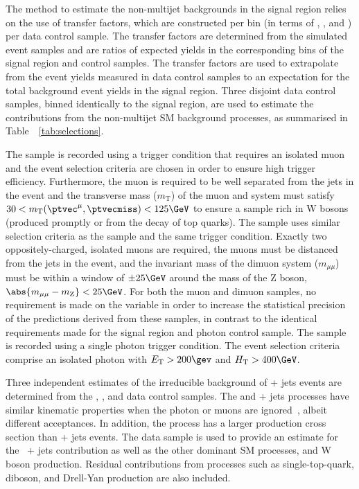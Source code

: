 The method to estimate the non-multijet backgrounds in the signal
region relies on the use of transfer factors, which are constructed
per bin (in terms of \njet, \nb, and \scalht) per data control
sample. The transfer factors are determined from the simulated event
samples and are ratios of expected yields in the corresponding bins of
the signal region and control samples. The transfer factors are used
to extrapolate from the event yields measured in data control samples
to an expectation for the total background event yields in the signal
region.  Three disjoint data control samples, binned identically to
the signal region, are used to estimate the contributions from the
non-multijet SM background processes, as summarised in
Table~~\ref{tab:selections}.

The \mj sample is recorded using a trigger condition that requires an
isolated muon and the event selection criteria are chosen in order to
ensure high trigger efficiency. Furthermore, the muon is required to
be well separated from the jets in the event and the transverse mass
($m_{\text{T}}$) of the muon and \ptvecmiss system must satisfy $30 <
m_\text{T}(\ptvec^\mu,\ptvecmiss) < 125\GeV$ to ensure a sample rich
in W bosons (produced promptly or from the decay of top quarks). The
\mmj sample uses similar selection criteria as the \mj sample and the
same trigger condition. Exactly two oppositely-charged, isolated muons
are required, the muons must be distanced from the jets in the event,
and the invariant mass of the dimuon system ($m_{\mu\mu}$) must be
within a window of $\pm 25\GeV$ around the mass of the Z boson, $
\abs{m_{\mu\mu} - m_\text{Z}} < 25\GeV$. For both the muon and dimuon
samples, no requirement is made on the variable \alphat in order to
increase the statistical precision of the predictions derived from
these samples, in contrast to the identical \alphat requirements made
for the signal region and photon control sample. The \gj sample is
recorded using a single photon trigger condition. The event selection
criteria comprise an isolated photon with $\Et > 200\gev$ and $\scalht
> 400\GeV$.

Three independent estimates of the irreducible background of \znunu +
jets events are determined from the \gj, \mmj, and \mj data control
samples. The \gj and \zmumu + jets processes have similar kinematic
properties when the photon or muons are ignored~\cite{Bern:2011pa}, 
albeit different acceptances. In addition, the \gj process has a
larger production cross section than \znunu + jets events. The \mj
data sample is used to provide an estimate for the \znunu\ + jets
contribution as well as the other dominant SM processes, \ttbar and W
boson production. Residual contributions from processes such as
single-top-quark, diboson, and Drell-Yan production are also included.

